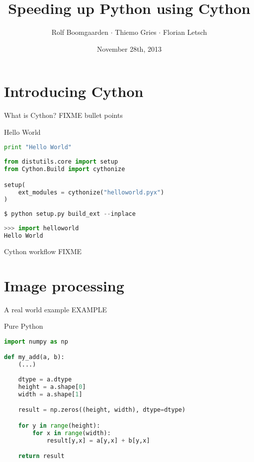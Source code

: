 \documentclass[dvipsnames]{beamer}
\title{Speeding up Python using Cython}
\author[Rolf $\cdot$ Thiemo $\cdot$ Flo]{Rolf Boomgaarden $\cdot$ Thiemo Gries $\cdot$ Florian Letsch}
\institute{Universität Hamburg}
\date{November 28th, 2013}
\begin{document}
\frame
{
\titlepage
}


\section{Introducing Cython}
\begin{frame}{What is Cython?}
FIXME bullet points
\end{frame}

\begin{frame}[fragile]{Hello World}
\begin{lstlisting}[language=Python]
print "Hello World"
\end{lstlisting}

\begin{lstlisting}[language=Python]
from distutils.core import setup
from Cython.Build import cythonize

setup(
    ext_modules = cythonize("helloworld.pyx")
)
\end{lstlisting}

\begin{lstlisting}[language=Python]
$ python setup.py build_ext --inplace
\end{lstlisting}

\begin{lstlisting}[language=Python]
>>> import helloworld
Hello World
\end{lstlisting}

\end{frame}

\begin{frame}{Cython workflow}
FIXME
\end{frame}


\section{Image processing}

\begin{frame}{A real world example}
EXAMPLE
\end{frame}

\begin{frame}[fragile]{Pure Python}
\begin{lstlisting}[language=Python,caption={add1.py}]
import numpy as np

def my_add(a, b):
    (...)
	
    dtype = a.dtype
    height = a.shape[0]
    width = a.shape[1]

    result = np.zeros((height, width), dtype=dtype)

    for y in range(height):
        for x in range(width):
            result[y,x] = a[y,x] + b[y,x]

    return result
\end{lstlisting}
\end{frame}
\end{document}
